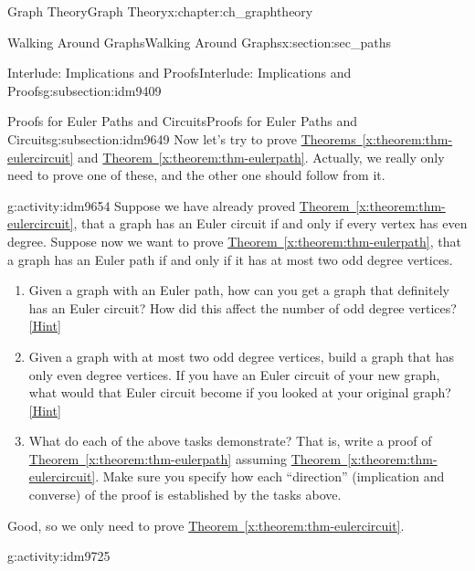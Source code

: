 \documentclass[oneside,10pt,]{book}
\numberwithin{equation}{chapter}
\begin{document}
\begin{chapterptx}{Graph Theory}{}{Graph Theory}{}{}{x:chapter:ch_graphtheory}
\begin{sectionptx}{Walking Around Graphs}{}{Walking Around Graphs}{}{}{x:section:sec_paths}
\begin{subsectionptx}{Interlude: Implications and Proofs}{}{Interlude: Implications and Proofs}{}{}{g:subsection:idm9409}
\end{subsectionptx}
%
%
\typeout{************************************************}
\typeout{************************************************}
%
\begin{subsectionptx}{Proofs for Euler Paths and Circuits}{}{Proofs for Euler Paths and Circuits}{}{}{g:subsection:idm9649}
Now let's try to prove \hyperref[x:theorem:thm-eulercircuit]{Theorems~\ref{x:theorem:thm-eulercircuit}} and \hyperref[x:theorem:thm-eulerpath]{Theorem~\ref{x:theorem:thm-eulerpath}}.  Actually, we really only need to prove one of these, and the other one should follow from it.%
\begin{activity}{}{g:activity:idm9654}%
Suppose we have already proved \hyperref[x:theorem:thm-eulercircuit]{Theorem~\ref{x:theorem:thm-eulercircuit}}, that a graph has an Euler circuit if and only if every vertex has even degree.  Suppose now we want to prove \hyperref[x:theorem:thm-eulerpath]{Theorem~\ref{x:theorem:thm-eulerpath}}, that a graph has an Euler path if and only if it has at most two odd degree vertices.%
\begin{enumerate}[font=\bfseries,label=(\alph*),ref=\alph*]
\item{}Given a graph with an Euler path, how can you get a graph that definitely has an Euler circuit?  How did this affect the number of odd degree vertices?%
\space\hspace*{0pt}\hfill{\tiny\hyperlink{g:hint:idm9662-back}{[Hint]}}\item{}Given a graph with at most two odd degree vertices, build a graph that has only even degree vertices.  If you have an Euler circuit of your new graph, what would that Euler circuit become if you looked at your original graph?%
\space\hspace*{0pt}\hfill{\tiny\hyperlink{g:hint:idm9686-back}{[Hint]}}\item{}What do each of the above tasks demonstrate?  That is, write a proof of \hyperref[x:theorem:thm-eulerpath]{Theorem~\ref{x:theorem:thm-eulerpath}} assuming \hyperref[x:theorem:thm-eulercircuit]{Theorem~\ref{x:theorem:thm-eulercircuit}}.  Make sure you specify how each ``direction'' (implication and converse) of the proof is established by the tasks above.%
\end{enumerate}
\end{activity}
Good, so we only need to prove \hyperref[x:theorem:thm-eulercircuit]{Theorem~\ref{x:theorem:thm-eulercircuit}}.%
\begin{activity}{}{g:activity:idm9725}%

\end{activity}
\end{subsectionptx}
\end{sectionptx}
\end{chapterptx}
\end{document}
